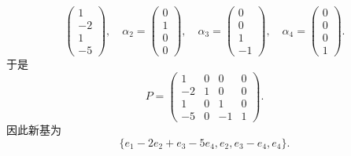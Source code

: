 \documentclass[../../main.tex]{subfiles}%
\begin{document}
\begin{solution}
\[\begin{pmatrix}
1 \\
-2 \\
1 \\
-5
\end{pmatrix}, \quad \alpha_2 = \begin{pmatrix}
0 \\
1 \\
0 \\
0
\end{pmatrix}, \quad \alpha_3 = \begin{pmatrix}
0 \\
0 \\
1 \\
-1
\end{pmatrix}, \quad \alpha_4 = \begin{pmatrix}
0 \\
0 \\
0 \\
1
\end{pmatrix}.
\]
于是
\[
P = \begin{pmatrix}
1 & 0 & 0 & 0 \\
-2 & 1 & 0 & 0 \\
1 & 0 & 1 & 0 \\
-5 & 0 & -1 & 1
\end{pmatrix}.
\]
因此新基为
\[
\{e_1 - 2e_2 + e_3 - 5e_4, e_2, e_3 - e_4, e_4\}.
\] 

\end{solution}
\end{document}
